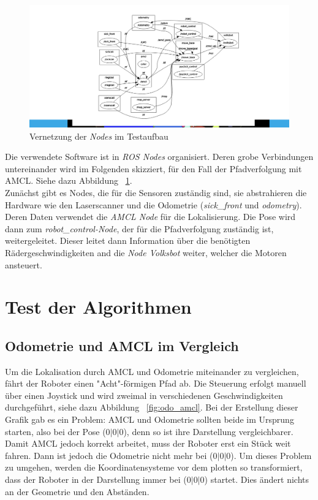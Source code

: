 \documentclass[11pt,a4paper]{article}
\begin{document}
{{	\begin{figure}[h]
		\includegraphics[trim=9cm 1cm 7cm 1cm , clip= true,width=\textwidth]{pictures/node_graph.png}
		\caption{Vernetzung der \textit{Nodes} im Testaufbau \label{fig:nodes}}
	\end{figure}
	Die verwendete Software ist in \textit{ROS Nodes} organisiert. Deren grobe Verbindungen untereinander wird im Folgenden skizziert, f\"ur den Fall der Pfadverfolgung mit AMCL. Siehe dazu Abbildung ~\ref{fig:nodes}. 
	\\
	Zun\"achst gibt es Nodes, die f\"ur die Sensoren zust\"andig sind, sie abstrahieren die Hardware wie den Laserscanner und die Odometrie (\textit{sick\_front} und \textit{odometry}). Deren Daten verwendet die \textit{AMCL Node} f\"ur die Lokalisierung. Die Pose wird dann zum \textit{robot\_control-Node}, der f\"ur die Pfadverfolgung zust\"andig ist, weitergeleitet. Dieser leitet dann Information \"uber die ben\"otigten R\"adergeschwindigkeiten and die \textit{Node Volksbot} weiter, welcher die Motoren ansteuert.
	
} 

\section{Test der Algorithmen} 
\subsection{Odometrie und AMCL im Vergleich}




	Um die Lokalisation durch AMCL und Odometrie miteinander zu vergleichen, f\"ahrt der Roboter einen "Acht"-f\"ormigen Pfad ab. Die Steuerung erfolgt manuell \"uber einen Joystick und wird zweimal in verschiedenen Geschwindigkeiten durchgef\"uhrt, siehe dazu Abbildung ~\ref{fig:odo_amcl}. Bei der Erstellung dieser Grafik gab es ein Problem: AMCL und Odometrie sollten beide im Ursprung starten, also bei der Pose (0$|$0$|$0), denn so ist ihre Darstellung vergleichbarer. Damit AMCL jedoch korrekt arbeitet, muss der Roboter erst ein St\"uck weit fahren. Dann ist jedoch die Odometrie nicht mehr bei (0$|$0$|$0). Um dieses Problem zu umgehen, werden die Koordinatensysteme vor dem plotten so transformiert, dass der Roboter in der Darstellung immer bei (0$|$0$|$0) startet. Dies \"andert nichts an der Geometrie und den Abst\"anden.    


}
\end{document}
